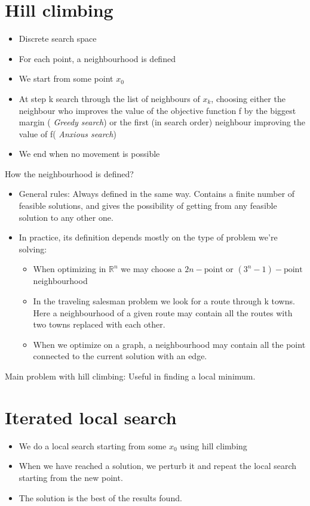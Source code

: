 \section{Hill climbing}
\begin{itemize}
        \item Discrete search space
        \item For each point, a neighbourhood is defined
        \item We start from some point $x_0$ 
        \item At step k search through the list of neighbours of $x_k$, choosing either the neighbour who improves the value of the 
            objective function f by the biggest margin ( \textit{Greedy search}) or the first (in search order) neighbour improving the value of f( \textit{Anxious search}) 
        \item We end when no movement is possible
\end{itemize}
How the neighbourhood is defined?
\begin{itemize}
        \item General rules: Always defined in the same way. Contains a finite number of feasible solutions, and gives the possibility of getting from any feasible solution to any other one.
        \item In practice, its definition depends mostly on the type of problem we're solving:
            \begin{itemize}
                \item When optimizing in $\mathbb{R}^{n}$ we may choose a $2n-\text{point}$ or  $(3^{n}-1)-\text{point}$ neighbourhood
                \item  In the traveling salesman problem we look for a route through k towns. Here a neighbourhood of a given route may contain all the routes with two towns replaced with each other.
                \item When we optimize on a graph, a neighbourhood may contain all the point connected to the current solution with an edge.
            \end{itemize}
\end{itemize}
Main problem with hill climbing:
Useful in finding a local minimum.


\section{Iterated local search}
\begin{itemize}
        \item We do a local search starting from some $x_0$ using hill climbing
        \item When we have reached a solution, we perturb it and repeat the local search starting from the new point.
        \item The solution is the best of the results found.        
\end{itemize}

